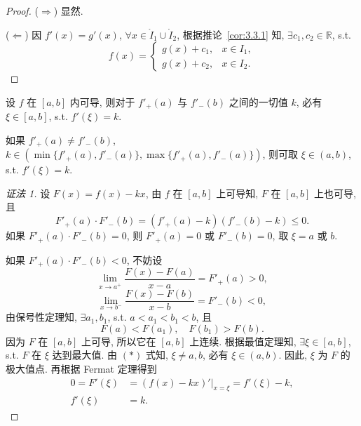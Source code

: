\begin{proof}
($\Rightarrow$) 显然.

($\Leftarrow$) 因 $f'(x)=g'(x)$, $\forall x\in\mathring{I}_1\cup\mathring{I}_2$, 根据推论~\ref{cor:3.3.1} 知, $\exists c_1,c_2\in\mathbb{R}$, s.t.
\[
f(x)=\begin{cases}g(x)+c_1,&x\in I_1,\\ g(x)+c_2,&x\in I_2.\end{cases}
\]
\end{proof}

\begin{theorem}\label{thm:3.3.5}
设 $f$ 在 $[a,b]$ 内可导, 则对于 $f'_+(a)$ 与 $f'_-(b)$ 之间的一切值 $k$, 必有 $\xi\in[a,b]$, s.t. $f'(\xi)=k$.
\end{theorem}

如果 $f'_+(a)\neq f'_-(b)$, $k\in(\min\{f'_+(a),f'_-(a)\},\max\{f'_+(a),f'_-(a)\})$, 则可取 $\xi\in(a,b)$, s.t. $f'(\xi)=k$.

\begin{proof}[证法 1]
设 $F(x)=f(x)-kx$, 由 $f$ 在 $[a,b]$ 上可导知, $F$ 在 $[a,b]$ 上也可导, 且
\[
F'_+(a)\cdot F'_-(b)=(f'_+(a)-k)(f'_-(b)-k)\leqslant0.
\]
如果 $F'_+(a)\cdot F'_-(b)=0$, 则 $F'_+(a)=0$ 或 $F'_-(b)=0$, 取 $\xi=a$ 或 $b$.

如果 $F'_+(a)\cdot F'_-(b)<0$, 不妨设
\[
\lim_{x\to a^+}\frac{F(x)-F(a)}{x-a}=F'_+(a)>0,
\]
\[
\lim_{x\to b^-}\frac{F(x)-F(b)}{x-b}=F'_-(b)<0,
\]
由保号性定理知, $\exists a_1,b_1$, s.t. $a<a_1<b_1<b$, 且
\[
F(a)<F(a_1),\quad F(b_1)>F(b).\tag*{(*)}
\]
因为 $F$ 在 $[a,b]$ 上可导, 所以它在 $[a,b]$ 上连续. 根据最值定理知, $\exists\xi\in[a,b]$, s.t. $F$ 在 $\xi$ 达到最大值. 由 $(*)$ 式知, $\xi\neq a,b$, 必有 $\xi\in(a,b)$. 因此, $\xi$ 为 $F$ 的极大值点. 再根据 Fermat 定理得到
\[
\begin{aligned}
0=F'(\xi)&=(f(x)-kx)'\big|_{x=\xi}=f'(\xi)-k,\\
f'(\xi)&=k.
\end{aligned}
\]
\end{proof}

